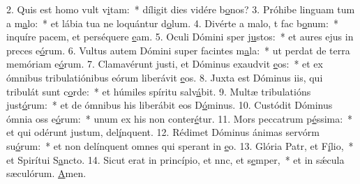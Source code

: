 2. Quis est homo  vult v\uline{i}tam:~* díligit dies vidére b\uline{o}nos?
3. Próhibe linguam tum a m\uline{a}lo:~* et lábia tua ne loquántur d\uline{o}lum.
4. Divérte a malo, t fac b\uline{o}num:~* inquíre pacem, et perséquere \uline{e}am.
5. Oculi Dómini sper j\uline{u}stos:~* et aures ejus in preces e\uline{ó}rum.
6. Vultus autem Dómini super facintes m\uline{a}la:~* ut perdat de terra memóriam e\uline{ó}rum.
7. Clamavérunt justi, et Dóminus exaudvit \uline{e}os:~* et ex ómnibus tribulatiónibus eórum liberávit \uline{e}os.
8. Juxta est Dóminus iis, qui tribulát sunt c\uline{o}rde:~* et húmiles spíritu salv\uline{á}bit.
9. Multæ tribulatións just\uline{ó}rum:~* et de ómnibus his liberábit eos D\uline{ó}minus.
10. Custódit Dóminus ómnia oss e\uline{ó}rum:~* unum ex his non conter\uline{é}tur.
11. Mors peccatrum p\uline{é}ssima:~* et qui odérunt justum, del\uline{í}nquent.
12. Rédimet Dóminus ánimas servórm su\uline{ó}rum:~* et non delínquent omnes qui sperant in \uline{e}o.
13. Glória Patr, et F\uline{í}lio,~* et Spirítui S\uline{a}ncto.
14. Sicut erat in princípio, et nnc, et s\uline{e}mper,~* et in sǽcula sæculórum. \uline{A}men.
